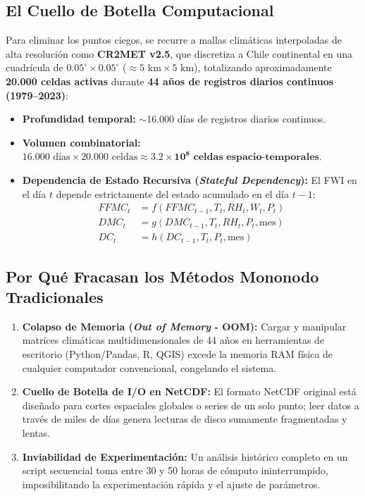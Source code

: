 \documentclass[11pt,a4paper]{article}
\begin{document}
\subsection{El Cuello de Botella Computacional}
Para eliminar los puntos ciegos, se recurre a mallas climáticas interpoladas de alta resolución como \textbf{CR2MET v2.5}, que discretiza a Chile continental en una cuadrícula de $0.05^\circ \times 0.05^\circ$ ($\approx 5\text{ km} \times 5\text{ km}$), totalizando aproximadamente \textbf{20.000 celdas activas} durante \textbf{44 años de registros diarios continuos (1979--2023)}:
\begin{itemize}[leftmargin=5mm]
    \item \textbf{Profundidad temporal:} $\sim$16.000 días de registros diarios continuos.
    \item \textbf{Volumen combinatorial:} $16.000\text{ días} \times 20.000\text{ celdas} \approx \mathbf{3.2 \times 10^8\text{ celdas espacio-temporales}}$.
    \item \textbf{Dependencia de Estado Recursiva (\textit{Stateful Dependency}):} El FWI en el día $t$ depende estrictamente del estado acumulado en el día $t-1$:
    \begin{align}
        FFMC_t &= f(FFMC_{t-1}, T_t, RH_t, W_t, P_t) \\
        DMC_t  &= g(DMC_{t-1}, T_t, RH_t, P_t, \text{mes}) \\
        DC_t   &= h(DC_{t-1}, T_t, P_t, \text{mes})
    \end{align}
\end{itemize}

\subsection{Por Qué Fracasan los Métodos Mononodo Tradicionales}
\begin{enumerate}[leftmargin=5mm]
    \item \textbf{Colapso de Memoria (\textit{Out of Memory} - OOM):} Cargar y manipular matrices climáticas multidimensionales de 44 años en herramientas de escritorio (Python/Pandas, R, QGIS) excede la memoria RAM física de cualquier computador convencional, congelando el sistema.
    \item \textbf{Cuello de Botella de I/O en NetCDF:} El formato NetCDF original está diseñado para cortes espaciales globales o series de un solo punto; leer datos a través de miles de días genera lecturas de disco sumamente fragmentadas y lentas.
    \item \textbf{Inviabilidad de Experimentación:} Un análisis histórico completo en un script secuencial toma entre 30 y 50 horas de cómputo ininterrumpido, imposibilitando la experimentación rápida y el ajuste de parámetros.
\end{enumerate}
\end{document}
